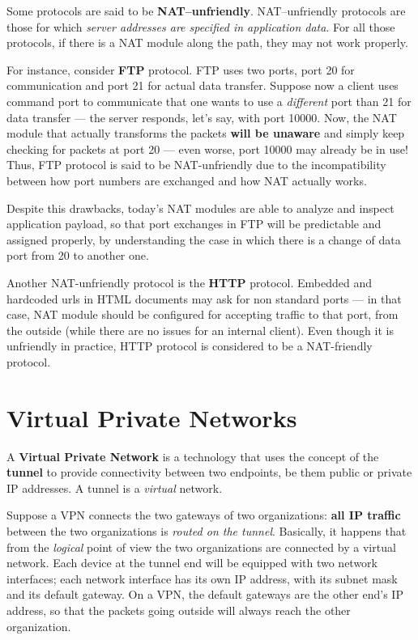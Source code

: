 \documentclass[10pt]{\classname}
\begin{document}
Some protocols are said to be \textbf{NAT--unfriendly}. NAT--unfriendly
protocols are those for which \emph{server addresses are specified in
application data}. For all those protocols, if there is a NAT module along the
path, they may not work properly.

For instance, consider \textbf{FTP} protocol. FTP uses two ports, port 20 for
communication and port 21 for actual data transfer. Suppose now a client uses
command port to communicate that one wants to use a \emph{different} port than
21 for data transfer --- the server responds, let's say, with port 10000. Now,
the NAT module that actually transforms the packets \textbf{will be unaware}
and simply keep checking for packets at port 20 --- even worse, port 10000 may
already be in use! Thus, FTP protocol is said to be NAT-unfriendly due to the
incompatibility between how port numbers are exchanged and how NAT actually
works.

Despite this drawbacks, today's NAT modules are able to analyze and inspect
application payload, so that port exchanges in FTP will be predictable and
assigned properly, by understanding the case in which there is a change of data
port from 20 to another one.

Another NAT-unfriendly protocol is the \textbf{HTTP} protocol. Embedded and
hardcoded urls in HTML documents may ask for non standard ports --- in that
case, NAT module should be configured for accepting traffic to that port, from
the outside (while there are no issues for an internal client). Even though it
is unfriendly in practice, HTTP protocol is considered to be a NAT-friendly
protocol.

\chapter{Virtual Private Networks}

A \textbf{Virtual Private Network} is a technology that uses the concept of the
\textbf{tunnel} to provide connectivity between two endpoints, be them public
or private IP addresses. A tunnel is a \emph{virtual} network.

Suppose a VPN connects the two gateways of two organizations: \textbf{all IP
traffic} between the two organizations is \emph{routed on the tunnel}.
Basically, it happens that from the \emph{logical} point of view the two
organizations are connected by a virtual network. Each device at the tunnel end
will be equipped with two network interfaces; each network interface has its
own IP address, with its subnet mask and its default gateway. On a VPN, the
default gateways are the other end's IP address, so that the packets going
outside will always reach the other organization.
\end{document}
